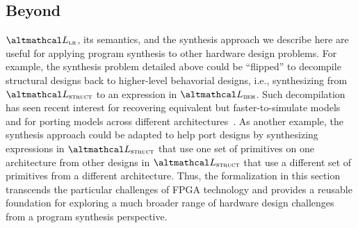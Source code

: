 \subsection{Beyond \lr}
\label{sec:sem-beyond}

$\UberLang$, its semantics,
  and the synthesis approach we describe here 
  are useful for applying program synthesis
  to other hardware design problems.
For example,
  the synthesis problem detailed above could be ``flipped''
  to decompile structural designs back 
  to higher-level behavorial designs,
  i.e., synthesizing from $\ImplLang$
  to an expression in $\SpecLang$.
Such decompilation has seen recent
  interest for
  recovering equivalent but faster-to-simulate
  models and for porting models across
  different architectures~\cite{sisco2023loop}.
As another example,
  the synthesis approach could be
  adapted to help port designs by
  synthesizing expressions in
  $\ImplLang$ that use one set of primitives
  on one architecture from 
  other designs in $\ImplLang$ that use
  a different set of primitives from
  a different architecture.
Thus, the formalization in this section
  transcends the particular challenges
  of FPGA technology and provides
  a reusable foundation for exploring
  a much broader range of hardware design challenges
  from a program synthesis perspective.
  